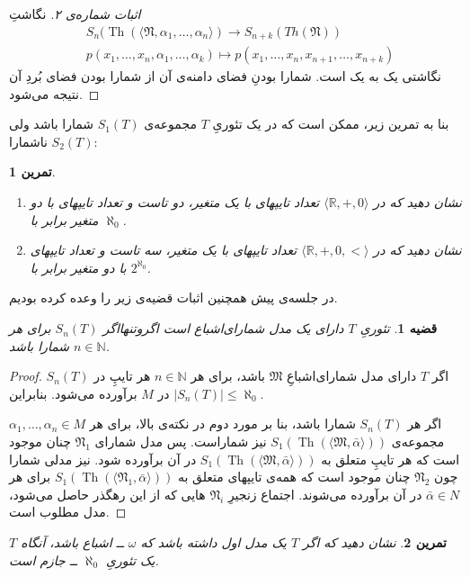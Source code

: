 \documentclass[12pt,a4paper]{report}
\theoremstyle{colorhead}
\newtheorem{thm}{قضیه}
\newtheorem{tam}{تمرین}
\DeclareMathOperator{\Th}{Th}
\begin{document}
\begin{proof}[اثبات شماره‌ی ۲]
نگاشتِ
\begin{align*}
&
S_n(\Th(\langle \mathfrak{N},\alpha_1,\ldots,\alpha_n\rangle)\to
S_{n+k}(Th(\mathfrak{N}))\\
& p(x_1,\ldots,x_n,\alpha_1,\ldots,\alpha_k)\mapsto p(x_1,\ldots,x_n,x_{n+1},\ldots,x_{n+k})
\end{align*}
نگاشتی یک به یک است. شمارا بودنِ
فضای دامنه‌ی آن از شمارا بودن فضای بُردِ آن نتیجه می‌شود.
\end{proof}
بنا به تمرین زیر، ممکن است که در یک تئوریِ
$T$
مجموعه‌ی
$S_1(T)$
شمارا باشد ولی
$S_2(T)$
ناشمارا:
\begin{tam}
\hfill
\begin{enumerate}
\item 
نشان دهید که در
$\langle \mathbb{R},+,0\rangle$
تعداد تایپهای با یک متغیر، دو تاست و تعداد تایپهای با دو متغیر برابر با
$\aleph_0$.
\item 
نشان دهید که در
$\langle \mathbb{R},+,0,<\rangle$
تعداد تایپهای با یک متغیر، سه تاست و تعداد تایپهای با دو متغیر برابر با
$2^{\aleph_0}$.
\end{enumerate}
\end{tam}
در جلسه‌ی پیش همچنین اثبات قضیه‌ی زیر را وعده کرده‌ بودیم.
\begin{thm}
تئوریِ
$T$
دارای یک مدل شمارای‌اشباع است اگروتنهااگر 
$S_n(T)$
برای هر
$n\in \mathbb{N}$
شمارا باشد. 
\end{thm}
\begin{proof}
اگر
$T$
دارای مدل شمارای‌اشباعِ
$\mathfrak{M}$ 
باشد، برای هر
$n\in \mathbb{N}$
هر تایپِ در
$S_n(T)$
در
$M$
برآورده می‌شود. بنابراین 
$|S_n(T)|\leq \aleph_0$.
\par 
اگر هر
$S_n(T)$
شمارا باشد، بنا بر مورد دوم
در نکته‌ی بالا، برای هر
$\alpha_1,\ldots,\alpha_n\in M$
مجموعه‌ی
$S_1(\Th(\langle \mathfrak{M},\bar{\alpha}\rangle))$
نیز شماراست. پس مدل شمارای 
$\mathfrak{N}_1$
چنان موجود است که هر تایپِ متعلق به
$S_1(\Th(\langle \mathfrak{M},\bar{\alpha}\rangle))$
در آن برآورده شود. نیز مدلی شمارا چون
$\mathfrak{N}_2$
چنان موجود است که همه‌ی تایپهای متعلق به 
$S_1(\Th(\langle \mathfrak{N}_1,\bar{\alpha}\rangle))$
برای هر
$\bar{\alpha}\in N$
در آن برآورده می‌شوند. اجتماع زنجیرِ
$\mathfrak{N}_i$
هایی که از این رهگذر حاصل می‌شود،‌ مدل مطلوب است.
\end{proof}
\begin{tam}
نشان دهید که اگر
$T$
یک مدل اول داشته باشد که
$\omega$
ــ
اشباع باشد، آنگاه $T$
یک تئوریِ
$\aleph_0$
ــ
جازم است. 
\end{tam}
\end{document}
